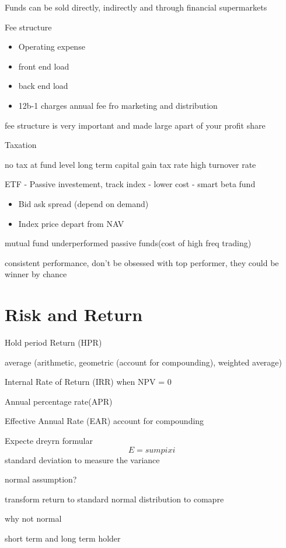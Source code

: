 \documentclass[
]{book}
\providecommand{\tightlist}{%
  \setlength{\itemsep}{0pt}\setlength{\parskip}{0pt}}
\begin{document}
Funds can be sold directly, indirectly and through financial supermarkets

Fee structure

\begin{itemize}
\tightlist
\item
  Operating expense
\item
  front end load
\item
  back end load
\item
  12b-1 charges annual fee fro marketing and distribution
\end{itemize}

fee structure is very important and made large apart of your profit share

Taxation

no tax at fund level
long term capital gain tax rate
high turnover rate

ETF
- Passive investement, track index
- lower cost
- smart beta fund

\begin{itemize}
\tightlist
\item
  Bid ask spread (depend on demand)
\item
  Index price depart from NAV
\end{itemize}

mutual fund underperformed passive funds(cost of high freq trading)

consistent performance, don't be obsessed with top performer, they could be winner by chance

\chapter{Risk and Return}\label{ch2}

Hold period Return (HPR)

average (arithmetic, geometric (account for compounding), weighted average)

Internal Rate of Return (IRR) when NPV = 0

Annual percentage rate(APR)

Effective Annual Rate (EAR) account for compounding

Expecte dreyrn formular \[E = sum pi xi\]
standard deviation to measure the variance

normal assumption?

transform return to standard normal distribution to comapre

why not normal

short term and long term holder
\end{document}
